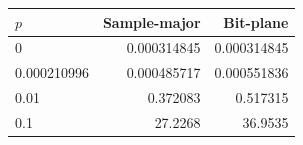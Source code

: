 \begin{tabular}{lrr}
\toprule
$p$ & Sample-major & Bit-plane \\
\midrule
0 & 0.000314845 & 0.000314845 \\
0.000210996 & 0.000485717 & 0.000551836 \\
0.01 & 0.372083 & 0.517315 \\
0.1 & 27.2268 & 36.9535 \\
\bottomrule
\end{tabular}
